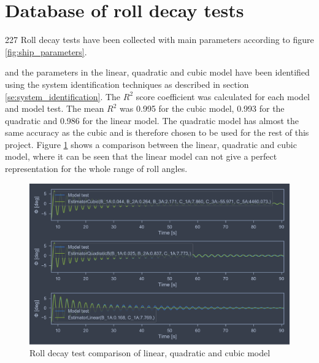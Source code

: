 \section{Database of roll decay tests}
\label{se:database_of_roll_decay_tests}

227 Roll decay tests have been collected with main parameters according to figure \ref{fig:ship_parameters}.

and the parameters in the linear, quadratic and cubic model have been identified using the system identification techniques as described in section \ref{se:system_identification}. The $R^2$ score coefficient was calculated for each model and model test. The mean $R^2$ was 0.995 for the cubic model, 0.993 for the quadratic and 0.986 for the linear model. The quadratic model has almost the same accuracy as the cubic and is therefore chosen to be used for the rest of this project. Figure \ref{fig:roll_decay_model_compare} shows a comparison between the linear, quadratic and cubic model, where it can be seen that the linear model can not give a perfect representation for the whole range of roll angles.    

\begin{figure}[H]
    \centering
    \includegraphics[width=0.9\columnwidth]{figures/roll_decay_model_compare.pdf}
    \caption{Roll decay test comparison of linear, quadratic and cubic model}
    \label{fig:roll_decay_model_compare}
\end{figure}


